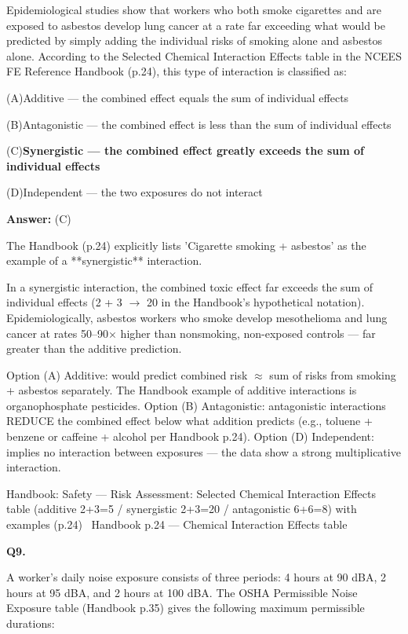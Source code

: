 \documentclass[11pt]{article}
\newcommand{\correct}[1]{\textbf{#1}\;{\color{accent}$\checkmark$}}
\newcommand{\optline}[2]{\par\noindent\hspace{1.2em}(#1)\hspace{0.6em}#2}
\begin{document}
Epidemiological studies show that workers who both smoke cigarettes and are exposed to asbestos develop lung cancer at a rate far exceeding what would be predicted by simply adding the individual risks of smoking alone and asbestos alone. According to the Selected Chemical Interaction Effects table in the NCEES FE Reference Handbook (p.24), this type of interaction is classified as:\par\vspace{3pt}
\optline{A}{Additive --- the combined effect equals the sum of individual effects}
\optline{B}{Antagonistic --- the combined effect is less than the sum of individual effects}
\optline{C}{\correct{Synergistic --- the combined effect greatly exceeds the sum of individual effects}}
\optline{D}{Independent --- the two exposures do not interact}
\par\vspace{3pt}
\vspace{2pt}\par\noindent\colorbox{boxbg}{\parbox{\dimexpr\linewidth-2\fboxsep\relax}{%
\vspace{2pt}\textbf{Answer:} (C)\par\vspace{2pt}
{\small The Handbook (p.24) explicitly lists 'Cigarette smoking + asbestos' as the example of a **synergistic** interaction.

In a synergistic interaction, the combined toxic effect far exceeds the sum of individual effects (2 + 3 $\rightarrow$ 20 in the Handbook's hypothetical notation). Epidemiologically, asbestos workers who smoke develop mesothelioma and lung cancer at rates 50--90$\times$ higher than nonsmoking, non-exposed controls --- far greater than the additive prediction.

Option (A) Additive: would predict combined risk $\approx$ sum of risks from smoking + asbestos separately. The Handbook example of additive interactions is organophosphate pesticides. Option (B) Antagonistic: antagonistic interactions REDUCE the combined effect below what addition predicts (e.g., toluene + benzene or caffeine + alcohol per Handbook p.24). Option (D) Independent: implies no interaction between exposures --- the data show a strong multiplicative interaction.}\par\vspace{2pt}
{\footnotesize\color{soft}Handbook: Safety --- Risk Assessment: Selected Chemical Interaction Effects table (additive 2+3=5 / synergistic 2+3=20 / antagonistic 6+6=8) with examples (p.24) \textbullet\ Handbook p.24 --- Chemical Interaction Effects table}\vspace{2pt}
}}
\vspace{9pt}
\filbreak
\textbf{\color{accent}Q9.}\quad {\small\color{soft}[D13-Q09 \textbullet\ MCQ \textbullet\ OSHA permissible noise exposure --- dose D = 100\% $\times$ $\Sigma$(Ci/Ti) (USCS)]}\par\vspace{2pt}
A worker's daily noise exposure consists of three periods: 4 hours at 90 dBA, 2 hours at 95 dBA, and 2 hours at 100 dBA. The OSHA Permissible Noise Exposure table (Handbook p.35) gives the following maximum permissible durations:
\end{document}
